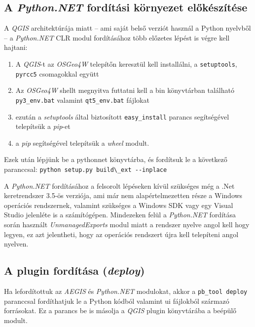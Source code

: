 \subsection{A \emph{Python.NET} fordítási környezet előkészítése}
A \emph{QGIS} architektúrája miatt -- ami saját belső verziót használ a Python nyelvből -- a \emph{Python.NET} CLR modul fordításához több előzetes lépést is végre kell hajtani:
\begin{enumerate}
	\item A \emph{QGIS}-t az \emph{OSGeo4W} telepítőn keresztül kell installálni, a \texttt{setuptools}, \texttt{pyrcc5} csomagokkal együtt
	\item Az \emph{OSGeo4W} shellt megnyitva futtatni kell a bin könyvtárban található \texttt{py3\_env.bat} valamint \texttt{qt5\_env.bat} fájlokat
	\item ezután a \emph{setuptools} által biztosított \texttt{easy\_install} parancs segítségével telepítsük a \emph{pip}-et
	\item a \emph{pip} segítségével telepítsük a \emph{wheel} modult.
\end{enumerate}
Ezek után lépjünk be a pythonnet könyvtárba, és fordítsuk le a következő paranccsal: \verb|python setup.py build\_ext --inplace|
\begin{note}
A \emph{Python.NET} fordításához a felsorolt lépéseken kívül szükséges még a .Net keretrendszer 3.5-ös verziója, ami már nem alapértelmezetten része a Windows operációs rendszernek, valamint szükséges a Windows SDK vagy egy Visual Studio jelenléte is a számítógépen. Mindezeken felül a \emph{Python.NET} fordítása során használt \emph{UnmanagedExports} modul miatt a rendszer nyelve angol kell hogy legyen, ez azt jelentheti, hogy az operációs rendszert újra kell telepíteni angol nyelven.
\end{note}
\subsection{A plugin fordítása (\emph{deploy})}
Ha lefordítottuk az \emph{AEGIS} és \emph{Python.NET} modulokat, akkor a \texttt{pb\_tool deploy} paranccsal fordíthatjuk le a Python kódból valamint ui fájlokból származó forrásokat. Ez a parancs be is másolja a \emph{QGIS} plugin könyvtárába a beépülő modult.

